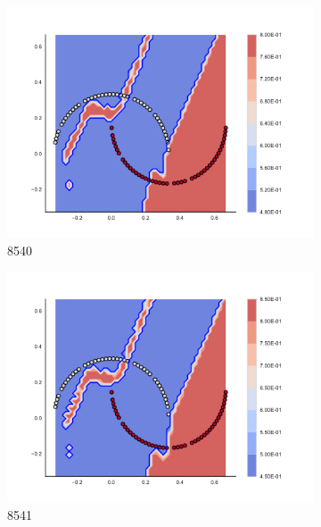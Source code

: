 \begin{figure}[h]
\begin{subfigure}[b]{0.09\textwidth}
    \includegraphics[clip, trim=2.35cm 1.75cm 4.5cm 0cm,width=\textwidth]{img/convergence/8540.pdf}
    \caption{8540}
    \label{fig:convergence_8540}
\end{subfigure}
%
\begin{subfigure}[b]{0.09\textwidth}
    \includegraphics[clip, trim=2.35cm 1.75cm 4.5cm 0cm,width=\textwidth]{img/convergence/8541.pdf}
    \caption{8541}
    \label{fig:convergence_8541}
\end{subfigure}
%
\begin{subfigure}[b]{0.09\textwidth}

\end{subfigure}
\end{figure}
